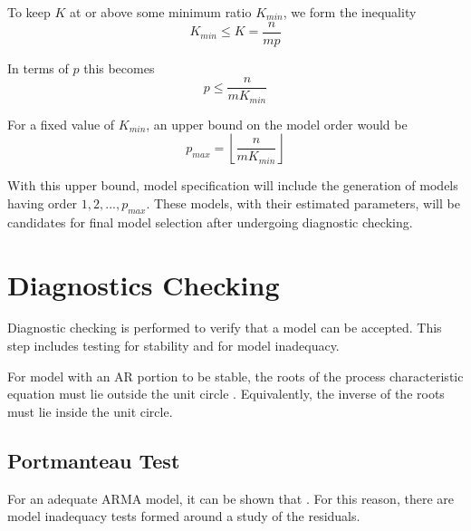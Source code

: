 \documentclass[letterpaper]{report}
\begin{document}
To keep $K$ at or above some minimum ratio $K_{min}$, we form the inequality
\begin{equation}
K_{min} \leq K = \frac{n}{m p}
\end{equation}

In terms of $p$ this becomes
\begin{equation}
p \le \frac{n}{m K_{min}}
\end{equation}

For a fixed value of $K_{min}$, an upper bound on the model order would be
\begin{equation}
p_{max} = \left \lfloor \frac{n}{m K_{min}} \right \rfloor
\end{equation}

With this upper bound, model specification will include the generation of models having order $1, 2,..., p_{max}$. These models, with their estimated parameters, will be candidates for final model selection after undergoing diagnostic checking.


\section*{Diagnostics Checking}
Diagnostic checking is performed to verify that a model can be accepted. This step includes testing for stability and for model inadequacy.

For model with an AR portion to be stable, the roots of the process characteristic equation must lie outside the unit circle \cite[p. 56]{box_jenkins_reinsel_2008}. Equivalently, the inverse of the roots must lie inside the unit circle. 

\subsection*{Portmanteau Test}
For an adequate ARMA model, it can be shown that  \cite[p. 338]{box_jenkins_reinsel_2008}. For this reason, there are model inadequacy tests formed around a study of the residuals.
\end{document}
